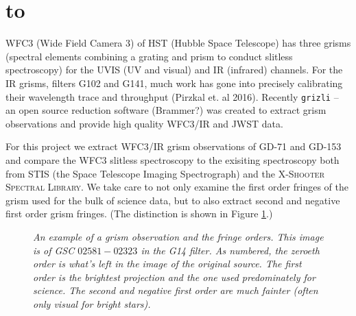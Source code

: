 \documentclass[12pt]{article}
\def\ssectionstar#1{\section*{\hbox to \hsize{\large\bf #1\hfill}}}
\begin{document}

\ssectionstar{Introduction}
\normalsize{

WFC3 (Wide Field Camera 3) of HST (Hubble Space Telescope) has three grisms (spectral elements combining a grating and prism 
to conduct slitless spectroscopy) for the UVIS (UV and visual) and IR
(infrared) channels. For the IR grisms, filters 
G102 and G141, much work has gone into precisely calibrating their wavelength trace and throughput (Pirzkal et. al 2016). 
Recently \texttt{grizli} -- an open source reduction software (Brammer?) was created to extract grism observations 
and provide high quality WFC3/IR and JWST data. 

For this project we extract WFC3/IR grism
observations of GD-71 and GD-153 and compare the WFC3 slitless spectroscopy to the exisiting spectroscopy
both from STIS (the Space Telescope Imaging Spectrograph) and the
\textsc{X-Shooter Spectral Library}. We take care
to not only examine the first order fringes of the grism used for the bulk of science data, but to also 
extract second and negative first order grism fringes. (The distinction is shown in Figure \ref{fig:grism_orders}.)

\begin{figure}[h!]
\caption{\textit{An example of a grism observation and the fringe orders. This image is of
    GSC $02581-02323$ in the G14 filter. As numbered, 
    the zeroeth order is what's left in the image of the original source. The first order is
    the brightest projection and the one used predominately for science. The second and negative first 
    order are much fainter (often only visual for bright stars).}}
\label{fig:grism_orders}
\end{figure}



}
\end{document}
